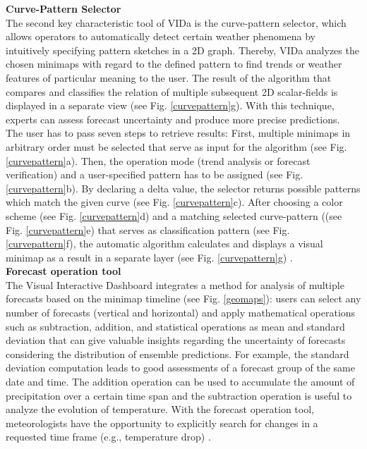 \documentclass[citeauthoryear]{llncs}
\begin{document}
\textbf{Curve-Pattern Selector} \\[0,2cm]
The second key characteristic tool of VIDa is the curve-pattern selector, which allows operators to automatically detect certain weather phenomena by intuitively specifying pattern sketches in a 2D graph. Thereby, VIDa analyzes the chosen minimaps with regard to the defined pattern to find trends or weather features of particular meaning to the user. The result of the algorithm that compares and classifies the relation of multiple subsequent 2D scalar-fields is displayed in a separate view (see Fig. \ref{curvepattern}g). With this technique, experts can assess forecast uncertainty and produce more precise predictions.\\
The user has to pass seven steps to retrieve results: First, multiple minimaps in arbitrary order must be selected that serve as input for the algorithm (see Fig. \ref{curvepattern}a). Then, the operation mode (trend analysis or forecast verification) and a user-specified pattern has to be assigned (see Fig. \ref{curvepattern}b). By declaring a delta value, the selector returns possible patterns which match the given curve (see Fig. \ref{curvepattern}c). After choosing a color scheme (see Fig. \ref{curvepattern}d) and a matching selected curve-pattern ((see Fig. \ref{curvepattern}e) that serves as classification pattern (see Fig. \ref{curvepattern}f), the automatic algorithm calculates and displays a visual minimap as a result in a separate layer (see Fig. \ref{curvepattern}g) \cite{diehl2015visual}.\\

\textbf{Forecast operation tool} \\[0,2cm]
The Visual Interactive Dashboard integrates a method for analysis of multiple forecasts based on the minimap timeline (see Fig. \ref{geomaps}): users can select any number of forecasts (vertical and horizontal) and apply mathematical operations such as subtraction, addition, and statistical operations as mean and standard deviation that can give valuable insights regarding the uncertainty of forecasts considering the distribution of ensemble predictions. For example, the standard deviation computation leads to good assessments of a forecast group of the same date and time. The addition operation can be used to accumulate the amount of precipitation over a certain time span and the subtraction operation is useful to analyze the evolution of temperature. With the forecast operation tool, meteorologists have the opportunity to explicitly search for changes in a requested time frame (e.g., temperature drop) \cite{diehl2015visual}.
\end{document}
